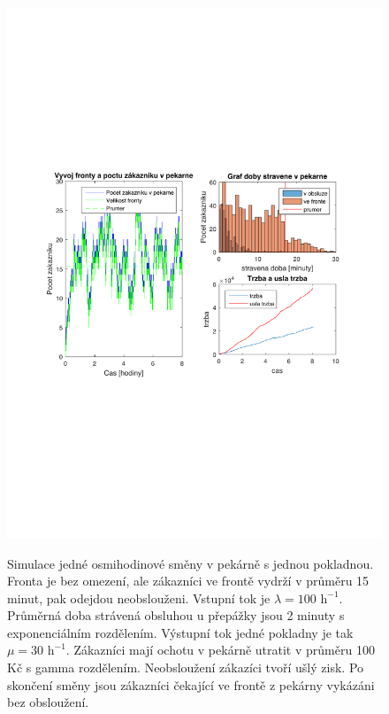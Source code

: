 \documentclass[a4paper,12pt]{article}
\begin{document}
\begin{figure}
\centering
\includegraphics[width=0.99\columnwidth]{jedenPrubeh.pdf}
\label{fig:jedenPrubeh}
\caption{Simulace jedné osmihodinové směny v pekárně s jednou pokladnou. Fronta je bez omezení, ale zákazníci ve frontě 
vydrží v průměru 15 minut, pak odejdou neobslouženi. Vstupní tok je \(\lambda = 100 \mbox{~h}^{-1}\). 
Průměrná doba strávená obsluhou u přepážky jsou 2 minuty s exponenciálním rozdělením. Výstupní tok 
jedné pokladny je tak \(\mu = 30 \mbox{~h}^{-1}\). Zákazníci mají ochotu v pekárně utratit v průměru 100 Kč s gamma rozdělením. 
Neobsloužení zákazíci tvoří ušlý zisk. Po skončení směny jsou zákazníci čekající ve frontě z pekárny vykázáni bez obsloužení.}
\end{figure}
\end{document}
